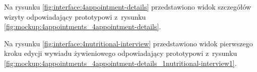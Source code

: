 
Na rysunku \ref{fig:interface:4appointment-details} przedstawiono widok szczegółów wizyty odpowiadający prototypowi z~rysunku \ref{fig:mockup:4appointments_4appointment-details}.


Na rysunku \ref{fig:interface:4nutritional-interview} przedstawiono widok pierwszego kroku edycji wywiadu żywieniowego odpowiadający prototypowi z~rysunku \ref{fig:mockup:4appointments_4appointment-details_1nutritional-interview1}.




\thispagestyle{normal}
